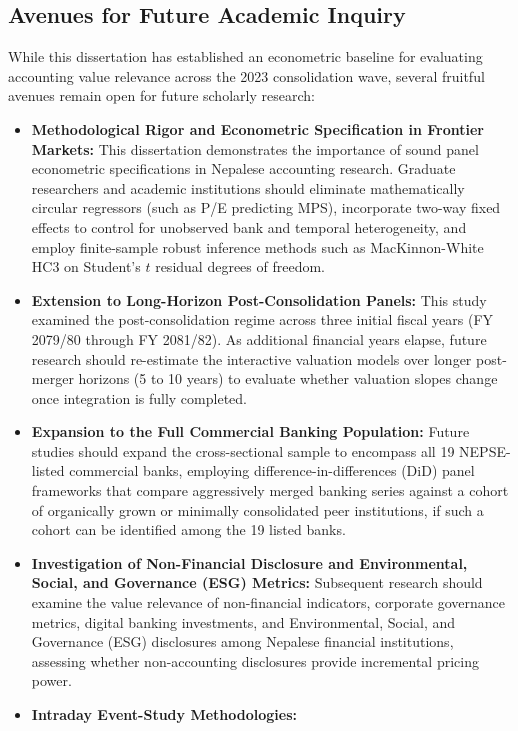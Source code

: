 \subsection{Avenues for Future Academic Inquiry}
While this dissertation has established an econometric baseline for evaluating accounting value relevance across the 2023 consolidation wave, several fruitful avenues remain open for future scholarly research:
\begin{itemize}
    \item \textbf{Methodological Rigor and Econometric Specification in Frontier Markets:}
    This dissertation demonstrates the importance of sound panel econometric specifications in Nepalese accounting research. Graduate researchers and academic institutions should eliminate mathematically circular regressors (such as P/E predicting MPS), incorporate two-way fixed effects to control for unobserved bank and temporal heterogeneity, and employ finite-sample robust inference methods such as MacKinnon-White HC3 on Student's $t$ residual degrees of freedom.
    \item \textbf{Extension to Long-Horizon Post-Consolidation Panels:}
    This study examined the post-consolidation regime across three initial fiscal years (FY 2079/80 through FY 2081/82). As additional financial years elapse, future research should re-estimate the interactive valuation models over longer post-merger horizons (5 to 10 years) to evaluate whether valuation slopes change once integration is fully completed.
    \item \textbf{Expansion to the Full Commercial Banking Population:}
    Future studies should expand the cross-sectional sample to encompass all 19 NEPSE-listed commercial banks, employing difference-in-differences (DiD) panel frameworks that compare aggressively merged banking series against a cohort of organically grown or minimally consolidated peer institutions, if such a cohort can be identified among the 19 listed banks.
    \item \textbf{Investigation of Non-Financial Disclosure and Environmental, Social, and Governance (ESG) Metrics:}
    Subsequent research should examine the value relevance of non-financial indicators, corporate governance metrics, digital banking investments, and Environmental, Social, and Governance (ESG) disclosures among Nepalese financial institutions, assessing whether non-accounting disclosures provide incremental pricing power.
    \item \textbf{Intraday Event-Study Methodologies:}

\end{itemize}
